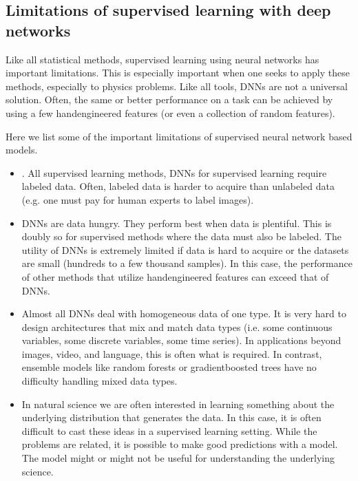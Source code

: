 \documentclass[letterpaper,10pt,english]{sphinxmanual}
\begin{document}
\subsection{Limitations of supervised learning with deep networks}
\label{\detokenize{chapter6:limitations-of-supervised-learning-with-deep-networks}}
Like all statistical methods, supervised learning using neural
networks has important limitations. This is especially important when
one seeks to apply these methods, especially to physics problems. Like
all tools, DNNs are not a universal solution. Often, the same or
better performance on a task can be achieved by using a few
hand\sphinxhyphen{}engineered features (or even a collection of random
features).

Here we list some of the important limitations of supervised neural network based models.
\begin{itemize}
\item {} 
. All supervised learning methods, DNNs for supervised learning require labeled data. Often, labeled data is harder to acquire than unlabeled data (e.g. one must pay for human experts to label images).

\item {} 
 DNNs are data hungry. They perform best when data is plentiful. This is doubly so for supervised methods where the data must also be labeled. The utility of DNNs is extremely limited if data is hard to acquire or the datasets are small (hundreds to a few thousand samples). In this case, the performance of other methods that utilize hand\sphinxhyphen{}engineered features can exceed that of DNNs.

\item {} 
 Almost all DNNs deal with homogeneous data of one type. It is very hard to design architectures that mix and match data types (i.e. some continuous variables, some discrete variables, some time series). In applications beyond images, video, and language, this is often what is required. In contrast, ensemble models like random forests or gradient\sphinxhyphen{}boosted trees have no difficulty handling mixed data types.

\item {} 
 In natural science we are often interested in learning something about the underlying distribution that generates the data. In this case, it is often difficult to cast these ideas in a supervised learning setting. While the problems are related, it is possible to make good predictions with a  model. The model might or might not be useful for understanding the underlying science.

\end{itemize}
\end{document}
